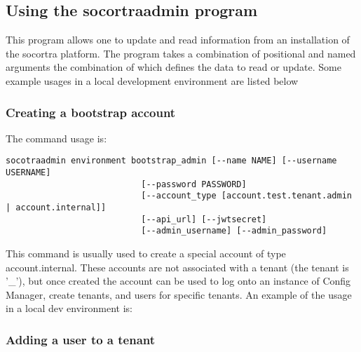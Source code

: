 \hypertarget{using-the-socortraadmin-program}{%
\subsection{Using the socortraadmin
program}\label{using-the-socortraadmin-program}}

This program allows one to update and read information from an
installation of the socortra platform. The program takes a combination
of positional and named arguments the combination of which defines the
data to read or update. Some example usages in a local development
environment are listed below

\hypertarget{creating-a-bootstrap-account}{%
\subsubsection{Creating a bootstrap
account}\label{creating-a-bootstrap-account}}

The command usage is:

\begin{verbatim}
socotraadmin environment bootstrap_admin [--name NAME] [--username USERNAME]
                           [--password PASSWORD]
                           [--account_type [account.test.tenant.admin | account.internal]]
                           [--api_url] [--jwtsecret]
                           [--admin_username] [--admin_password]
\end{verbatim}

This command is usually used to create a special account of type
account.internal. These accounts are not associated with a tenant (the
tenant is '\_'), but once created the account can be used to log onto an
instance of Config Manager, create tenants, and users for specific
tenants. An example of the usage in a local dev environment is:

\begin{Shaded}
\begin{Highlighting}[]
 
\end{Highlighting}
\end{Shaded}

\hypertarget{adding-a-user-to-a-tenant}{%
\subsubsection{Adding a user to a
tenant}\label{adding-a-user-to-a-tenant}}

